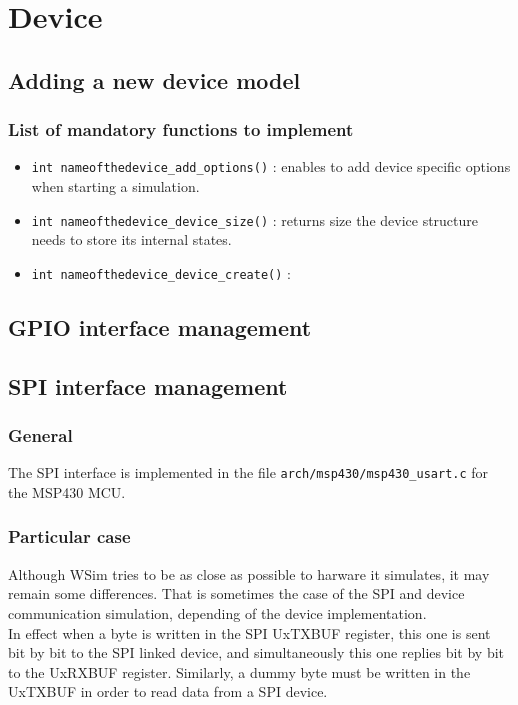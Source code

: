 \documentclass[a4paper,10pt]{report}
\begin{document}
\section{Device}
\subsection{Adding a new device model}
\subsubsection{List of mandatory functions to implement}
\begin{itemize}
  \item \verb$int nameofthedevice_add_options()$ : enables to add device specific options when starting a simulation.
  \item \verb$int nameofthedevice_device_size()$ : returns size the device structure needs to store its internal states.
  \item \verb$int nameofthedevice_device_create()$ : 

\end{itemize}

\subsection{GPIO interface management}

\subsection{SPI interface management}
\subsubsection{General}
The SPI interface is implemented in the file \verb$arch/msp430/msp430_usart.c$ for the MSP430 MCU.

\subsubsection{Particular case}
Although WSim tries to be as close as possible to harware it simulates, it may remain some differences. That is sometimes the case of the SPI and device communication simulation, depending of the device implementation.\\

In effect when a byte is written in the SPI UxTXBUF register, this one is sent bit by bit to the SPI linked device, and simultaneously this one replies bit by bit to the UxRXBUF register. Similarly, a dummy byte must be written in the UxTXBUF in order to read data from a SPI device.\\
\end{document}
